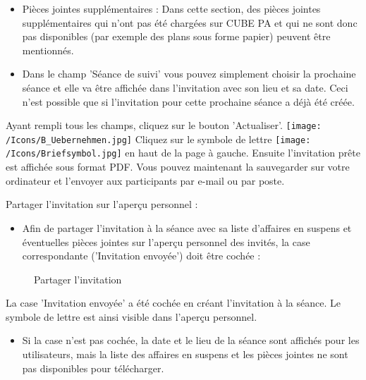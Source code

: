 \begin{itemize}
\item 
Pièces jointes supplémentaires  : Dans cette section, des pièces jointes supplémentaires qui n'ont pas été chargées sur CUBE PA et qui ne sont donc pas disponibles (par exemple des plans sous forme papier) peuvent être mentionnés.
\item 
Dans le champ 'Séance de suivi' vous pouvez simplement choisir la prochaine séance et elle va être affichée dans l'invitation avec son lieu et sa date. Ceci n'est possible que si l'invitation pour cette prochaine séance a déjà été créée.
\end{itemize}

Ayant rempli tous les champs, cliquez sur le bouton 'Actualiser'. \texttt{[image: /Icons/B\_Uebernehmen.jpg]} \newline
Cliquez sur le symbole de lettre \texttt{[image: /Icons/Briefsymbol.jpg]} en haut de la page à gauche. Ensuite l'invitation prête est affichée sous format PDF. Vous pouvez maintenant la sauvegarder sur votre ordinateur et l'envoyer aux participants par e-mail ou par poste.

\vspace{\baselineskip}

Partager l'invitation sur l'aperçu personnel :

\begin{itemize}
\item
Afin de partager l'invitation à la séance avec sa liste d'affaires en suspens et éventuelles pièces jointes sur l'aperçu personnel des invités, la case correspondante ('Invitation envoyée') doit être cochée :
\end{itemize}

\begin{figure}[H]
\caption{Partager l'invitation}
\end{figure}

\begin{small}
La case 'Invitation envoyée' a été cochée en créant l'invitation à la séance. Le symbole de lettre est ainsi visible dans l'aperçu personnel.
\end{small}

\begin{itemize}
\item
Si la case n'est pas cochée, la date et le lieu de la séance sont affichés pour les utilisateurs, mais la liste des affaires en suspens et les pièces jointes ne sont pas disponibles pour télécharger.
\end{itemize}

